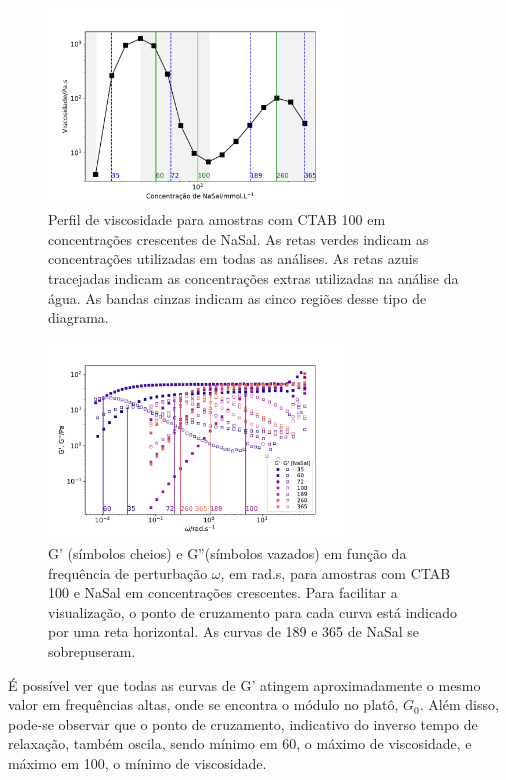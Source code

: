 		\begin{figure}[h]
			\centering
			\includegraphics[width=0.7\textwidth]{imagens/reologia/RH_agua_oscilatorio}
			\caption{Perfil de viscosidade para amostras com CTAB 100 \mM{} em concentrações crescentes de NaSal. As retas verdes indicam as concentrações utilizadas em todas as análises. As retas azuis tracejadas indicam as concentrações extras utilizadas na análise da água. As bandas cinzas indicam as cinco regiões desse tipo de diagrama.}
			\label{fig:rh_agua_oscilatorio}
		\end{figure}
		
		\begin{figure}[h]
			\centering
			\includegraphics[width=0.7\textwidth]{imagens/reologia/oscilatorio_agua}
			\caption[Reogramas para água]{G' (símbolos cheios) e G''(símbolos vazados) em função da frequência de perturbação \(\omega\), em rad.s\menosUm, para amostras com CTAB 100\mM{} e NaSal em concentrações crescentes. Para facilitar a visualização, o ponto de cruzamento para cada curva está indicado por uma reta horizontal. As curvas de 189 e 365\mM{} de NaSal se sobrepuseram.}
			\label{fig:oscilatorio_agua}
		\end{figure}
		
		É possível ver que todas as curvas de G' atingem aproximadamente o mesmo valor em frequências altas, onde se encontra o módulo no platô, \(G_0\). Além disso, pode-se observar que o ponto de cruzamento, indicativo do inverso tempo de relaxação, também oscila, sendo mínimo em 60\mM, o máximo de viscosidade, e máximo em 100\mM, o mínimo de viscosidade. 
		

